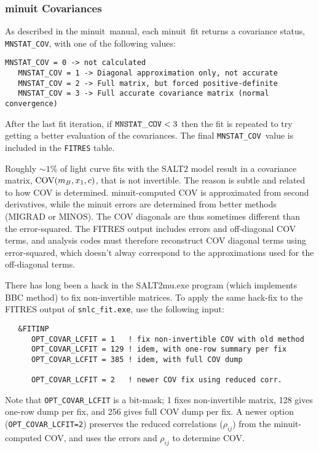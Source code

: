 \documentclass[12pt]{article}
\newcommand{\minuit}{{\sc minuit}}
\begin{document}
   \subsubsection{ {\minuit} Covariances}
   \label{sss:minuit_cov}

\newcommand{\mnstat}{{\tt MNSTAT\_COV}}
As described in the \minuit\ manual, 
each \minuit\ fit returns a covariance status, 
\mnstat, with one of the following values:
%
\begin{Verbatim}[frame=single]
   MNSTAT_COV = 0 -> not calculated 
   MNSTAT_COV = 1 -> Diagonal approximation only, not accurate
   MNSTAT_COV = 2 -> Full matrix, but forced positive-definite
   MNSTAT_COV = 3 -> Full accurate covariance matrix (normal convergence)
\end{Verbatim}
%
After the last fit iteration, if $\mnstat < 3$ then the fit is repeated
to try getting a better evaluation of the covariances.
The final \mnstat\ value is included in the {\tt FITRES} table. 


\bigskip
Roughly $\sim 1$\% of light curve fits with the SALT2 model
result in a covariance matrix, ${\rm COV}(m_B,x_1,c)$, 
that is not invertible. 
The reason is subtle and related to how COV is determined.
{\minuit}-computed COV is approximated from second derivatives,
while the {\minuit} errors are determined from better methods 
(MIGRAD or MINOS).
The COV diagonals are thus sometimes different than the error-squared.
The FITRES output includes errors and off-diagonal COV terms,
and analysis codes must therefore reconstruct COV diagonal terms using
error-squared, which doesn't alway correspond to the approximations
used for the off-diagonal terms.


There has long been a hack in the SALT2mu.exe program 
(which implements BBC method) to fix non-invertible  matrices. 
To apply the same hack-fix to the FITRES output of
{\tt snlc\_fit.exe}, use the following input:
\begin{verbatim}
   &FITINP
      OPT_COVAR_LCFIT = 1   ! fix non-invertible COV with old method
      OPT_COVAR_LCFIT = 129 ! idem, with one-row summary per fix
      OPT_COVAR_LCFIT = 385 ! idem, with full COV dump

      OPT_COVAR_LCFIT = 2   ! newer COV fix using reduced corr.
\end{verbatim}
Note that {\tt OPT\_COVAR\_LCFIT} is a bit-mask;
1 fixes non-invertible matrix, 128 gives one-row dump per fix,
and 256 gives full COV dump per fix. 
A newer option ({\tt OPT\_COVAR\_LCFIT=2}) preserves the
reduced correlations ($\rho_{ij}$) from the {\minuit}-computed COV,
and uses the errors and $\rho_{ij}$ to determine COV.
\end{document}

